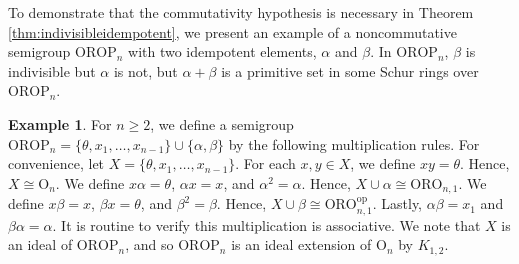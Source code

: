\documentclass{article}
\theoremstyle{plain}
\theoremstyle{definition}
\newtheorem{Exam}[Thm]{Example}
\renewcommand{\O}{\mathrm{O}}
\newcommand{\ORO}{\mathrm{ORO}}
\newcommand{\OROP}{\mathrm{OROP}}
\begin{document}
To demonstrate that the commutativity hypothesis is necessary in Theorem \ref{thm:indivisibleidempotent}, we present an example of a noncommutative semigroup $\OROP_n$ with two idempotent elements, $\alpha$ and $\beta$. In $\OROP_n$, $\beta$ is indivisible but $\alpha$ is not, but $\alpha+\beta$ is a primitive set in some Schur rings over $\OROP_n$.

\begin{Exam}
    For $n\ge 2$, we define a semigroup \label{orop}$\OROP_n = \{\theta,x_1,\ldots, x_{n-1}\}\cup\{\alpha,\beta\}$ by the following multiplication rules. For convenience,  let $X = \{\theta,x_1,\ldots, x_{n-1}\}$. For each $x,y\in X$, we define $xy=\theta$. Hence, $X\cong \O_n$. We define $x\alpha = \theta$, $\alpha x= x$, and $\alpha^2=\alpha$. Hence, $X\cup \alpha \cong\ORO_{n,1}$. We define $x\beta = x$, $\beta x = \theta$, and $\beta^2 = \beta$. Hence, $X\cup \beta\cong \ORO_{n,1}^\text{op}$. Lastly, $\alpha\beta =x_1$ and $\beta\alpha=\alpha$. It is routine to verify this multiplication is associative. We note that $X$ is an ideal of $\OROP_n$, and so $\OROP_n$ is an ideal extension of $\O_n$ by $K_{1,2}$. 



\end{Exam}
\end{document}
